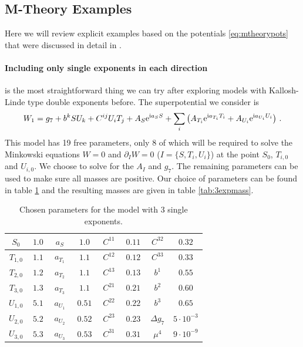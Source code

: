 \documentclass[12pt]{report}
\newcommand{\be}{\begin{equation}}
\newcommand{\ee}{\end{equation}}
\def\rmi{{\rm i}}
\def\rme{{\rm e}}
\begin{document}
\subsection{M-Theory Examples}
\label{sec:mtheoryexamples}
Here we will review explicit examples based on the potentials \eqref{eq:mtheorypots} that were discussed in detail in \cite{Cribiori:2019hrb}.
\paragraph{Including only single exponents in each direction} is the most straightforward thing we can try after exploring models with Kallosh-Linde type double exponents before. The superpotential we consider is
\be 
W_1 = g_7 + b^k S U_k + C^{ij} U_i T_j + A_S \rme^{\rmi a_S S} + \sum_i \left( A_{T_i} \rme^{\rmi a_{T_i}T_i} + A_{U_i} \rme^{\rmi a_{U_i}U_i} \right)\,.
\ee
This model has 19 free parameters, only 8 of which will be required to solve the Minkowski equations $W = 0$ and $\partial_I W = 0$ ($I = \{S, T_i, U_i \}$) at the point $S_0$, $T_{i,0}$ and $U_{i,0}$. We choose to solve for the $A_I$ and $g_7$. The remaining parameters can be used to make sure all masses are positive. Our choice of parameters can be found in table \ref{tab:3exppara} and the resulting masses are given in table \ref{tab:3expmass}.
\begin{table}[htb]
\center
\begin{tabular}{|c|c||c|c||c|c||c|c|}\hline
 $\,S_0\,$     & $1.0$   & $\,a_S\,$ & $\;1.0\,$ &$\,C^{11}\,$ & $\,0.11\,$ &  $\,C^{32}\,$ & $\,0.32\,$\\\hline
 $T_{1,0}$ & $\,1.1\,$ & $\,a_{T_1}\,$ & $\;1.1\,$ & $C^{12}$ & $0.12$ & $C^{33}$ & $0.33$ \\\hline
 $T_{2,0}$ & $1.2$ & $\,a_{T_2}\,$ & $\;1.1\,$ & $C^{13}$ & $0.13$ & $b^1$     & $0.55$\\\hline
 $T_{3,0}$ & $1.3$ & $\,a_{T_3}\,$ & $\;1.1\,$ & $C^{21}$ & $0.21$ & $b^2$     & $0.60$  \\\hline
 $U_{1,0}$ & $5.1$ & $\,a_{U_1}\,$ & $\;0.51\,$ & $C^{22}$ & $0.22$ & $b^3$     & $0.65$ \\\hline
 $U_{2,0}$ & $5.2$ & $\,a_{U_2}\,$ & $\;0.52\,$ & $C^{23}$ & $0.23$ & $\Delta g_7$ & $5 \cdot 10^{-3} $ \\\hline
 $U_{3,0}$ & $5.3$ & $\,a_{U_3}\,$ & $\;0.53\,$ & $C^{31}$ & $0.31$ & $\mu^4$ & $ 9 \cdot 10^{-9} $ \\\hline
\end{tabular}
\caption{Chosen parameters for the model with 3 single exponents.}
\label{tab:3exppara}
\end{table}
\end{document}
